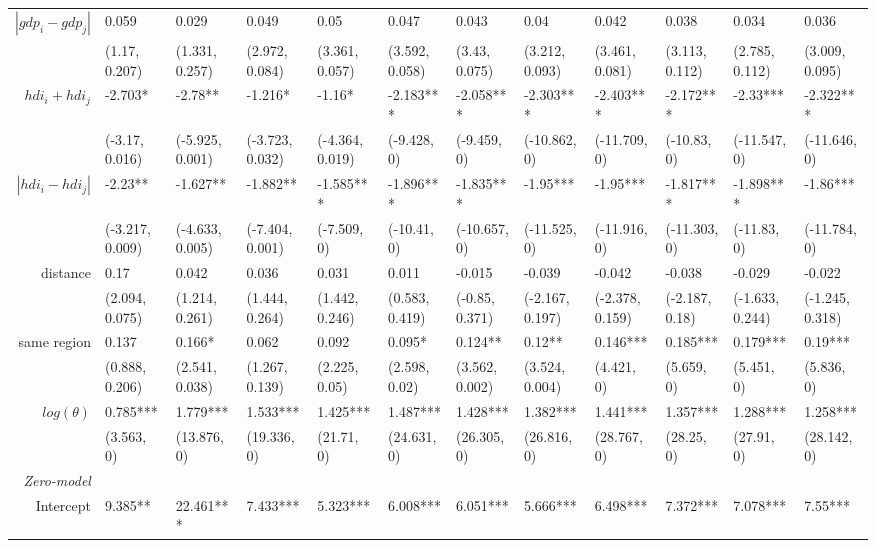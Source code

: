 {\begin{landscape}
\begin{table}[ht]
\begin{threeparttable}
\begin{tiny}
\begin{tabular}{rlllllllllll}
  $|gdp_i - gdp_j|$ & 0.059 & 0.029 & 0.049 & 0.05 & 0.047 & 0.043 & 0.04 & 0.042 & 0.038 & 0.034 & 0.036 \\ 
   & (1.17, 0.207) & (1.331, 0.257) & (2.972, 0.084) & (3.361, 0.057) & (3.592, 0.058) & (3.43, 0.075) & (3.212, 0.093) & (3.461, 0.081) & (3.113, 0.112) & (2.785, 0.112) & (3.009, 0.095) \\ 
 $hdi_i + hdi_j$ & -2.703* & -2.78** & -1.216* & -1.16* & -2.183*** & -2.058*** & -2.303*** & -2.403*** & -2.172*** & -2.33*** & -2.322*** \\ 
   & (-3.17, 0.016) & (-5.925, 0.001) & (-3.723, 0.032) & (-4.364, 0.019) & (-9.428, 0) & (-9.459, 0) & (-10.862, 0) & (-11.709, 0) & (-10.83, 0) & (-11.547, 0) & (-11.646, 0) \\ 
 $|hdi_i - hdi_j|$ & -2.23** & -1.627** & -1.882** & -1.585*** & -1.896*** & -1.835*** & -1.95*** & -1.95*** & -1.817*** & -1.898*** & -1.86*** \\ 
   & (-3.217, 0.009) & (-4.633, 0.005) & (-7.404, 0.001) & (-7.509, 0) & (-10.41, 0) & (-10.657, 0) & (-11.525, 0) & (-11.916, 0) & (-11.303, 0) & (-11.83, 0) & (-11.784, 0) \\ 
  distance & 0.17 & 0.042 & 0.036 & 0.031 & 0.011 & -0.015 & -0.039 & -0.042 & -0.038 & -0.029 & -0.022 \\ 
   & (2.094, 0.075) & (1.214, 0.261) & (1.444, 0.264) & (1.442, 0.246) & (0.583, 0.419) & (-0.85, 0.371) & (-2.167, 0.197) & (-2.378, 0.159) & (-2.187, 0.18) & (-1.633, 0.244) & (-1.245, 0.318) \\ 
  same region & 0.137 & 0.166* & 0.062 & 0.092 & 0.095* & 0.124** & 0.12** & 0.146*** & 0.185*** & 0.179*** & 0.19*** \\ 
   & (0.888, 0.206) & (2.541, 0.038) & (1.267, 0.139) & (2.225, 0.05) & (2.598, 0.02) & (3.562, 0.002) & (3.524, 0.004) & (4.421, 0) & (5.659, 0) & (5.451, 0) & (5.836, 0) \\ 
     $log(\theta)$ & 0.785*** & 1.779*** & 1.533*** & 1.425*** & 1.487*** & 1.428*** & 1.382*** & 1.441*** & 1.357*** & 1.288*** & 1.258*** \\ 
  & (3.563, 0) & (13.876, 0) & (19.336, 0) & (21.71, 0) & (24.631, 0) & (26.305, 0) & (26.816, 0) & (28.767, 0) & (28.25, 0) & (27.91, 0) & (28.142, 0) \\ 
   \noalign{\smallskip}\hline\noalign{\smallskip}
      	\textit{Zero-model} & & & & & & & & & & & \\
\noalign{\smallskip}
 Intercept & 9.385** & 22.461*** & 7.433*** & 5.323*** & 6.008*** & 6.051*** & 5.666*** & 6.498*** & 7.372*** & 7.078*** & 7.55*** \\ 

\end{tabular}
\end{tiny}
\end{threeparttable}
\end{table}
\end{landscape}}
